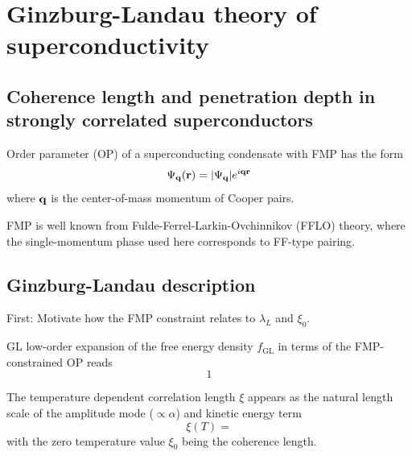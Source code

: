 \documentclass[../main.tex]{subfiles}
\begin{document}
\chapter{Ginzburg-Landau theory of superconductivity}

\section{Coherence length and penetration depth in strongly correlated superconductors}

\cite{wittBypassingLatticeBCSBEC2024}

Order parameter (OP) of a superconducting condensate with FMP has the form
\begin{equation}
    \Psi_{\bm{\mathrm{q}}} (\bm{\mathrm{r}}) = \vert \Psi_{\bm{\mathrm{q}}} \vert e^{i \bm{\mathrm{q}} \bm{\mathrm{r}}}
\end{equation}
where \(\bm{\mathrm{q}}\) is the center-of-mass momentum of Cooper pairs.

FMP is well known from Fulde-Ferrel-Larkin-Ovchinnikov (FFLO) theory, where the single-momentum phase used here corresponds to FF-type pairing. 

\section{Ginzburg-Landau description}

First: Motivate how the FMP constraint relates to \(\lambda_L\) and \(\xi_0\).

GL low-order expansion of the free energy density \(f_{\mathrm{GL}}\) in terms of the FMP-constrained OP reads
\begin{equation}
    1
\end{equation}


The temperature dependent correlation length \(\xi\) appears as the natural length scale of the amplitude mode (\(\propto \alpha\)) and kinetic energy term
\begin{equation}
    \xi (T) =
\end{equation}
with the zero temperature value \(\xi_0\) being the coherence length.


\end{document}
